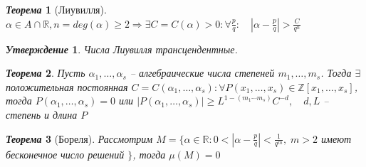 \documentclass[a4paper,12pt]{article}
\newtheorem{teo2}{\textit{Теорема}}
\newtheorem{utv2}{\textit{Утверждение}}
\newcommand{\AL}{\alpha}
\newcommand{\q}{\quad}
\newcommand{\Ra}{\Rightarrow}
\newcommand{\bb}[1]{\mathbb{#1}}
\begin{document}
\begin{formbox}{}
\begin{teo2} [Лиувилля] $\AL \in A\cap \bb{R}, n = deg(\AL) \ge 2\Ra \exists C = C(\AL) > 0: \forall \frac{p}{q}:\q \left|\AL - \frac{p}{q} \right| > \frac{C}{q^n} $
\end{teo2}
\end{formbox}
\begin{formbox}{}
\begin{utv2} Числа Лиувилля трансцендентные.
\end{utv2}
\end{formbox}
\begin{formbox}{}
\begin{teo2} Пусть $\AL_1,\dots,\AL_s$ -- алгебраические числа степеней $m_1,\dots, m_s$. Тогда $\exists$ положительная постоянная $C = C(\AL_1, \dots, \AL_s): \forall P(x_1,\dots,x_s)\in\bb{Z}[x_1,\dots,x_s]$, тогда $P(\AL_1, \dots, \AL_s) = 0$  или $|P(\AL_1, \dots, \AL_s)|\ge L^{1-(m_1\cdots m_s)}C^{-d}, \q d,L$ -- степень и длина $P$
\end{teo2}
\end{formbox}
\begin{formbox}{}
\begin{teo2} [Бореля] Рассмотрим $M = \{\AL\in\bb{R}: 0 < \left|\AL - \frac{p}{q}\right| < \frac{1}{q^m},\; m>2$ имеют бесконечное число решений $\}$, тогда $\mu(M) = 0$
\end{teo2}
\end{formbox}
\end{document}
